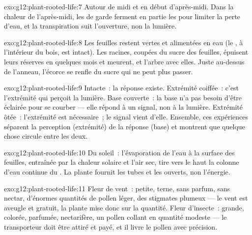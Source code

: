 \begin{solution}{exo:g12:plant-rooted-life:7}
Autour de midi et en début d'après-midi. Dans la chaleur de
l'après-midi, les  de garde ferment en partie les 
pour limiter la perte d'eau, et la transpiration suit l'ouverture, non
la lumière.
\end{solution}

\begin{solution}{exo:g12:plant-rooted-life:8}
Les feuilles restent vertes et alimentées en eau (le , à
l'intérieur du bois, est intact). Les racines, coupées du sucre des
feuilles, épuisent leurs réserves en quelques mois et meurent, et
l'arbre avec elles. Juste au-dessus de l'anneau, l'écorce se renfle du
sucre qui ne peut plus passer.
\end{solution}

\begin{solution}{exo:g12:plant-rooted-life:9}
Intacte~: la réponse existe. Extrémité coiffée~: c'est l'extrémité qui
perçoit la lumière. Base couverte~: la base n'a pas besoin d'être
éclairée pour se courber --- elle répond à un signal, non à la
lumière. Extrémité ôtée~: l'extrémité est nécessaire~; le signal vient
d'elle. Ensemble, ces expériences séparent la perception (extrémité)
de la réponse (base) et montrent que quelque chose circule entre les
deux.
\end{solution}

\begin{solution}{exo:g12:plant-rooted-life:10}
Du soleil~: l'évaporation de l'eau à la surface des feuilles,
entraînée par la chaleur solaire et l'air sec, tire vers le haut la
colonne d'eau continue du . La plante fournit les tubes et les
 ouverts, non l'énergie.
\end{solution}

\begin{solution}{exo:g12:plant-rooted-life:11}
Fleur de vent~: petite, terne, sans parfum, sans nectar, d'énormes
quantités de pollen léger, des stigmates plumeux --- le vent est
aveugle et gratuit, la plante mise donc sur la quantité. Fleur
d'insecte~: grande, colorée, parfumée, nectarifère, un pollen collant
en quantité modeste --- le transporteur doit être attiré et payé, et
il livre le pollen avec précision.
\end{solution}

